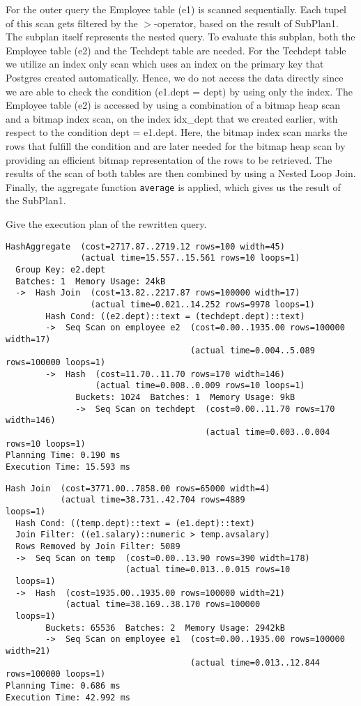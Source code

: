 \documentclass[11pt]{scrartcl}
\begin{document}
    For the outer query the Employee table (e1) is scanned sequentially.
    Each tupel of this scan gets filtered by the $>$-operator, based on the result of SubPlan1.
    The subplan itself represents the nested query.
    To evaluate this subplan, both the Employee table (e2) and the Techdept table are needed.
    For the Techdept table we utilize an index only scan which uses an index on the primary key that Postgres created
    automatically.
    Hence, we do not access the data directly since we are able to check the condition (e1.dept = dept) by using only
    the index.
    The Employee table (e2) is accessed by using a combination of a bitmap heap scan and a bitmap index scan, on the index
    idx\_dept that we created earlier, with respect to the condition dept = e1.dept.
    Here, the bitmap index scan marks the rows that fulfill the condition and are later needed for the bitmap heap scan
    by providing an efficient bitmap representation of the rows to be retrieved.
    The results of the scan of both tables are then combined by using a Nested Loop Join.
    Finally, the aggregate function \texttt{average} is applied, which gives us the result of the SubPlan1.

    Give the execution plan of the rewritten query.

            {\small
    \parskip0pt\begin{verbatim}
HashAggregate  (cost=2717.87..2719.12 rows=100 width=45)
               (actual time=15.557..15.561 rows=10 loops=1)
  Group Key: e2.dept
  Batches: 1  Memory Usage: 24kB
  ->  Hash Join  (cost=13.82..2217.87 rows=100000 width=17)
                 (actual time=0.021..14.252 rows=9978 loops=1)
        Hash Cond: ((e2.dept)::text = (techdept.dept)::text)
        ->  Seq Scan on employee e2  (cost=0.00..1935.00 rows=100000 width=17)
                                     (actual time=0.004..5.089 rows=100000 loops=1)
        ->  Hash  (cost=11.70..11.70 rows=170 width=146)
                  (actual time=0.008..0.009 rows=10 loops=1)
              Buckets: 1024  Batches: 1  Memory Usage: 9kB
              ->  Seq Scan on techdept  (cost=0.00..11.70 rows=170 width=146)
                                        (actual time=0.003..0.004 rows=10 loops=1)
Planning Time: 0.190 ms
Execution Time: 15.593 ms
    \end{verbatim}}

            {\small
    \parskip0pt\begin{verbatim}
Hash Join  (cost=3771.00..7858.00 rows=65000 width=4)
           (actual time=38.731..42.704 rows=4889
loops=1)
  Hash Cond: ((temp.dept)::text = (e1.dept)::text)
  Join Filter: ((e1.salary)::numeric > temp.avsalary)
  Rows Removed by Join Filter: 5089
  ->  Seq Scan on temp  (cost=0.00..13.90 rows=390 width=178)
                        (actual time=0.013..0.015 rows=10
  loops=1)
  ->  Hash  (cost=1935.00..1935.00 rows=100000 width=21)
            (actual time=38.169..38.170 rows=100000
  loops=1)
        Buckets: 65536  Batches: 2  Memory Usage: 2942kB
        ->  Seq Scan on employee e1  (cost=0.00..1935.00 rows=100000 width=21)
                                     (actual time=0.013..12.844 rows=100000 loops=1)
Planning Time: 0.686 ms
Execution Time: 42.992 ms
    \end{verbatim}}
\end{document}
